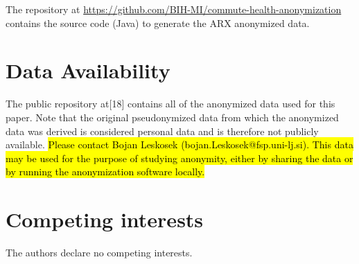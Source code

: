 \documentclass[10pt]{article}
\newcommand{\mycite}[1]{[#1]}
\begin{document}
The repository at {\small \url{https://github.com/BIH-MI/commute-health-anonymization}} contains the source code (Java) to generate the ARX anonymized data.

\section*{Data Availability}

The public repository at\mycite{18} contains all of the anonymized data used for this paper. Note that the original pseudonymized data from which the anonymized data was derived is considered personal data and is therefore not publicly available.  \hl{Please contact Bojan Leskosek (bojan.Leskosek@fsp.uni-lj.si). This data may be used for the purpose of studying anonymity, either by sharing the data or by running the anonymization software locally.}

\section*{Competing interests}

The authors declare no competing interests.

%
\end{document}
